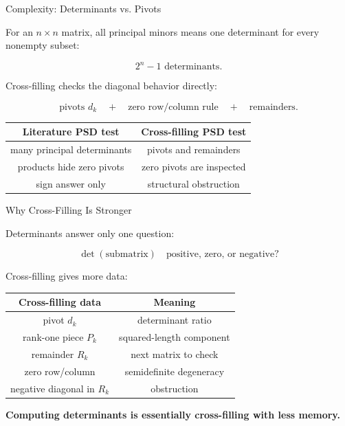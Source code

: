 \documentclass[10pt]{beamer}
\theoremstyle{definition}
\newcommand{\x}[1]{\alert{\textbf{#1}}}
\begin{document}
\begin{frame}{Complexity: Determinants vs. Pivots}

For an $n\times n$ matrix, all principal minors means one determinant for every nonempty subset:

$$
\boxed{2^n-1\text{ determinants}.}
$$

\vfill

Cross-filling checks the diagonal behavior directly:

$$
\boxed{\text{pivots }d_k\quad+\quad\text{zero row/column rule}\quad+\quad\text{remainders}.}
$$

\vfill

\begin{center}
\renewcommand{\arraystretch}{1.25}
\begin{tabular}{c|c}
\textbf{Literature PSD test} & \textbf{Cross-filling PSD test}\\
\hline
many principal determinants & pivots and remainders\\
products hide zero pivots & zero pivots are inspected\\
sign answer only & structural obstruction
\end{tabular}
\end{center}

\end{frame}


\begin{frame}{Why Cross-Filling Is Stronger}

Determinants answer only one question:

$$
\det(\text{submatrix})\quad \text{positive, zero, or negative?}
$$

\vfill

Cross-filling gives more data:

\begin{center}
\small
\renewcommand{\arraystretch}{1.15}
\begin{tabular}{c|c}
\textbf{Cross-filling data} & \textbf{Meaning}\\
\hline
pivot $d_k$ & determinant ratio\\
rank-one piece $P_k$ & squared-length component\\
remainder $R_k$ & next matrix to check\\
zero row/column & semidefinite degeneracy\\
negative diagonal in $R_k$ & obstruction
\end{tabular}
\end{center}

\vfill

\begin{center}
\x{Computing determinants is essentially cross-filling with less memory.}
\end{center}

\end{frame}
\end{document}
